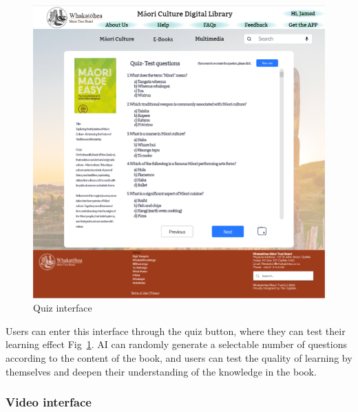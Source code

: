 \begin{figure}[htbp]
  \centerline{\includegraphics[width=400pt]{images/3-2-4.png}}
  \caption{Quiz interface}
  \label{fig3.2.4}
\end{figure}

Users can enter this interface through the quiz button, where they can test their learning effect Fig~\ref{fig3.2.4}. AI can randomly generate a selectable number of questions according to the content of the book, and users can test the quality of learning by themselves and deepen their understanding of the knowledge in the book.

\subsubsection{Video interface}

